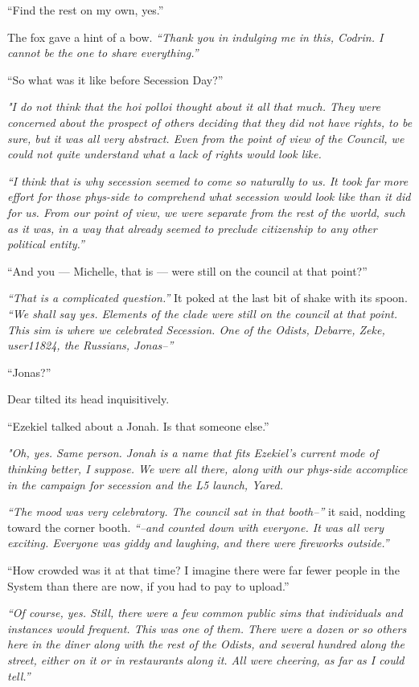 ``Find the rest on my own, yes.''

The fox gave a hint of a bow. \emph{``Thank you in indulging me in this, Codrin. I cannot be the one to share everything.''}

``So what was it like before Secession Day?''

\emph{"I do not think that the hoi polloi thought about it all that much. They were concerned about the prospect of others deciding that they did not have rights, to be sure, but it was all very abstract. Even from the point of view of the Council, we could not quite understand what a lack of rights would look like.}

\emph{``I think that is why secession seemed to come so naturally to us. It took far more effort for those phys-side to comprehend what secession would look like than it did for us. From our point of view, we were separate from the rest of the world, such as it was, in a way that already seemed to preclude citizenship to any other political entity.''}

``And you — Michelle, that is — were still on the council at that point?''

\emph{``That is a complicated question.''} It poked at the last bit of shake with its spoon. \emph{``We shall say yes. Elements of the clade were still on the council at that point. This sim is where we celebrated Secession. One of the Odists, Debarre, Zeke, user11824, the Russians, Jonas--''}

``Jonas?''

Dear tilted its head inquisitively.

``Ezekiel talked about a Jonah. Is that someone else.''

\emph{"Oh, yes. Same person. Jonah is a name that fits Ezekiel's current mode of thinking better, I suppose. We were all there, along with our phys-side accomplice in the campaign for secession and the L5 launch, Yared.}

\emph{``The mood was very celebratory. The council sat in that booth--''} it said, nodding toward the corner booth. \emph{``--and counted down with everyone. It was all very exciting. Everyone was giddy and laughing, and there were fireworks outside.''}

``How crowded was it at that time? I imagine there were far fewer people in the System than there are now, if you had to pay to upload.''

\emph{``Of course, yes. Still, there were a few common public sims that individuals and instances would frequent. This was one of them. There were a dozen or so others here in the diner along with the rest of the Odists, and several hundred along the street, either on it or in restaurants along it. All were cheering, as far as I could tell.''}

